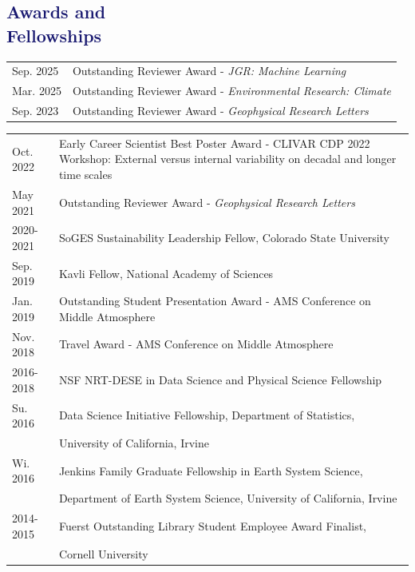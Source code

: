 \documentclass[margin,line,palatino,courier,10pt]{res}
\begin{document}
\begin{resume}
\section{\sc \textcolor{MidnightBlue}{\large{\textbf{Awards and\\ Fellowships}}}}
\begin{tabular}{@{}p{0.9in}p{4in}}
Sep. 2025 & Outstanding Reviewer Award - \textit{JGR: Machine Learning}\\
Mar. 2025 & Outstanding Reviewer Award - \textit{Environmental Research: Climate}\\
Sep. 2023 & Outstanding Reviewer Award - \textit{Geophysical Research Letters}\\
\end{tabular}
\begin{tabular}{@{}p{0.9in}p{4in}}
Oct. 2022 & Early Career Scientist Best Poster Award - CLIVAR CDP 2022 Workshop: External versus internal variability on decadal and longer time scales\\
May 2021 & Outstanding Reviewer Award - \textit{Geophysical Research Letters}\\
2020-2021 & SoGES Sustainability Leadership Fellow, Colorado State University\\
Sep. 2019 & Kavli Fellow, National Academy of Sciences\\
Jan. 2019 & Outstanding Student Presentation Award - AMS Conference on Middle Atmosphere\\
Nov. 2018 & Travel Award - AMS Conference on Middle Atmosphere\\
2016-2018 & NSF NRT-DESE in Data Science and Physical Science Fellowship\\
Su. 2016 & Data Science Initiative Fellowship, Department of Statistics, \\
& University of California, Irvine\\
Wi. 2016 & Jenkins Family Graduate Fellowship in Earth System Science,\\ 
& Department of Earth System
Science, University of California, Irvine\\
2014-2015 & Fuerst Outstanding Library Student Employee Award Finalist,\\
& Cornell University
\end{tabular}


\vspace{-0.1in}
\noindent\textcolor{MidnightBlue}{\makebox[\linewidth][r]{\rule{\textwidth}{5pt}}}
\vspace{-0.3in}


\end{resume}
\end{document}
